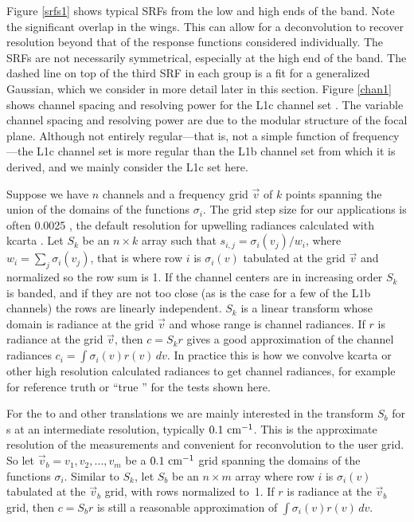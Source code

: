 \documentclass[11pt]{article}
\begin{document}
Figure \ref{srfs1} shows typical {\airs} SRFs from the low and high
ends of the band.  Note the significant overlap in the wings.  This
can allow for a deconvolution to recover resolution beyond that of
the response functions considered individually.  The SRFs are not
necessarily symmetrical, especially at the high end of the band.
The dashed line on top of the third SRF in each group is a fit for a
generalized Gaussian, which we consider in more detail later in this
section.  Figure \ref{chan1} shows channel spacing and resolving
power for the {\airs} L1c channel set \cite{a1c:atbd}.  The variable
channel spacing and resolving power are due to the modular structure
of the focal plane.  Although not entirely regular---that is, not a
simple function of frequency---the L1c channel set is more regular
than the L1b channel set from which it is derived, and we mainly
consider the L1c set here.

Suppose we have $n$ channels and a frequency grid $\vec v$ of 
$k$ points spanning the union of the domains of the functions
$\sigma_i$.  The grid step size for our applications is often 0.0025
{\wn}, the default resolution for upwelling radiances calculated
with kcarta \cite{kcarta1}.  Let $S_k$ be an $n\times k$ array such 
that $s_{i,j} = \sigma_i(v_j)/w_i$, where $w_i = \sum_j \sigma_i(v_j)$,
that is where row $i$ is $\sigma_i(v)$ tabulated at the grid $\vec
v$ and normalized so the row sum is 1.  If the channel centers are
in increasing order $S_k$ is banded, and if they are not too close
(as is the case for a few of the L1b channels) the rows are linearly
independent.  $S_k$ is a linear transform whose domain is radiance
at the grid $\vec v$ and whose range is channel radiances.  If $r$
is radiance at the grid $\vec v$, then $c = S_k r$ gives a good
approximation of the channel radiances $c_i = \int\sigma_i(v)r(v)\,dv$.
In practice this is how we convolve kcarta or other high resolution
calculated radiances to get {\airs} channel radiances, for example
for reference truth or ``true {\airs}'' for the tests shown here.


For the {\airs} to {\cris} and other translations we are mainly
interested in the transform $S_b$ for {\srf}s at an intermediate
resolution, typically $0.1~\mbox{cm$^{-1}$}$.  This is the approximate resolution
of the {\srf} measurements and convenient for reconvolution to the
{\cris} user grid.  So let $\vec v_b = v_1,v_2,\ldots,v_m$ be a
$0.1~\mbox{cm$^{-1}$}$ grid spanning the domains of the functions $\sigma_i$.
Similar to $S_k$, let $S_b$ be an $n\times m$ array where row $i$ is
$\sigma_i(v)$ tabulated at the $\vec v_b$ grid, with rows normalized
to~1.  If $r$ is radiance at the $\vec v_b$ grid, then $c = S_b r$
is still a reasonable approximation of $\int\sigma_i(v)r(v)\,dv$.
\end{document}
